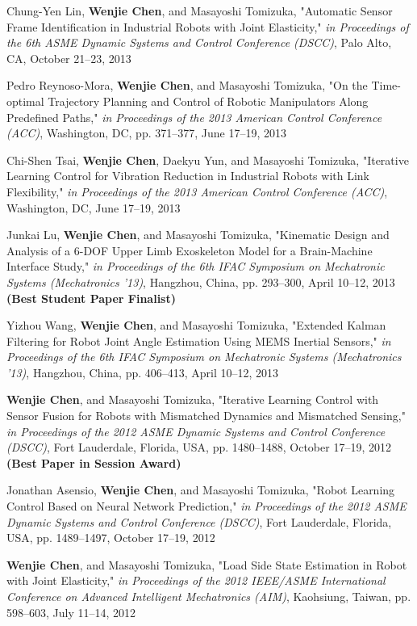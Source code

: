 \documentclass[UTF8,fontset=none]{res}
\begin{document}
\begin{resume}
\begin{etaremune}[start=26]
    \item Chung-Yen Lin, \textbf{Wenjie Chen}, and Masayoshi Tomizuka, "Automatic Sensor Frame Identification in Industrial Robots with Joint Elasticity," \emph{in Proceedings of the 6th ASME Dynamic Systems and Control Conference (DSCC)}, Palo Alto, CA, October 21--23, 2013
    \item Pedro Reynoso-Mora, \textbf{Wenjie Chen}, and Masayoshi Tomizuka, "On the Time-optimal Trajectory Planning and Control of Robotic Manipulators Along Predefined Paths," \emph{in Proceedings of the 2013 American Control Conference (ACC)}, Washington, DC, pp. 371--377, June 17--19, 2013
    \item Chi-Shen Tsai, \textbf{Wenjie Chen}, Daekyu Yun, and Masayoshi Tomizuka, "Iterative Learning Control for Vibration Reduction in Industrial Robots with Link Flexibility," \emph{in Proceedings of the 2013 American Control Conference (ACC)}, Washington, DC, June 17--19, 2013
    \item Junkai Lu, \textbf{Wenjie Chen}, and Masayoshi Tomizuka, "Kinematic Design and Analysis of a 6-DOF Upper Limb Exoskeleton Model for a Brain-Machine Interface Study," \emph{in Proceedings of the 6th IFAC Symposium on Mechatronic Systems (Mechatronics '13)}, Hangzhou, China, pp. 293--300, April 10--12, 2013 \textbf{(Best Student Paper Finalist)}
    \item Yizhou Wang, \textbf{Wenjie Chen}, and Masayoshi Tomizuka, "Extended Kalman Filtering for Robot Joint Angle Estimation Using MEMS Inertial Sensors,"  \emph{in Proceedings of the 6th IFAC Symposium on Mechatronic Systems (Mechatronics '13)}, Hangzhou, China, pp. 406--413, April 10--12, 2013
    \item \textbf{Wenjie Chen}, and Masayoshi Tomizuka, "Iterative Learning Control with Sensor Fusion for Robots with Mismatched Dynamics and Mismatched Sensing," \emph{in Proceedings of the 2012 ASME Dynamic Systems and Control Conference (DSCC)}, Fort Lauderdale, Florida, USA, pp. 1480--1488, October 17--19, 2012 \textbf{(Best Paper in Session Award)}
    \item Jonathan Asensio, \textbf{Wenjie Chen}, and Masayoshi Tomizuka, "Robot Learning Control Based on Neural Network Prediction," \emph{in Proceedings of the 2012 ASME Dynamic Systems and Control Conference (DSCC)}, Fort Lauderdale, Florida, USA, pp. 1489--1497, October 17--19, 2012
    \item \textbf{Wenjie Chen}, and Masayoshi Tomizuka, "Load Side State Estimation in Robot with Joint Elasticity," \emph{in Proceedings of the 2012 IEEE/ASME International Conference on Advanced Intelligent Mechatronics (AIM)}, Kaohsiung, Taiwan, pp. 598--603, July 11--14, 2012

\end{etaremune}
\end{resume}
\end{document}
